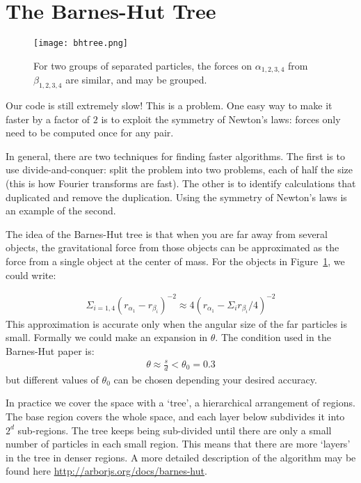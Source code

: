 \documentclass[12pt]{article}
\begin{document}
\section{The Barnes-Hut Tree}

\begin{figure}
\texttt{[image: bhtree.png]}
\centering
\caption{For two groups of separated particles, the forces on $\alpha_{1,2,3,4}$ from $\beta_{1,2,3,4}$ are similar, and may be grouped.}
\label{fig:particles}
\end{figure}

Our code is still extremely slow! This is a problem. One easy way to make it faster by a factor of $2$ is to exploit the symmetry of Newton's laws: forces only need to be computed once for any pair.

In general, there are two techniques for finding faster algorithms. The first is to use divide-and-conquer: split the problem into two problems, each of half the size (this is how Fourier transforms are fast). The other is to identify calculations that duplicated and remove the duplication. Using the symmetry of Newton's laws is an example of the second.

The idea of the Barnes-Hut tree is that when you are far away from several objects, the gravitational force from those objects can be approximated as the force from a single object at the center of mass. For the objects in Figure~\ref{fig:particles}, we could write:

\begin{align}
 \Sigma_{i=1,4} (r_{\alpha_1} - r_{\beta_i})^{-2} \approx 4 (r_{\alpha_1} - \Sigma_i r_{\beta_i} / 4)^{-2}
\end{align}
This approximation is accurate only when the angular size of the far particles is small. Formally we could make an expansion in $\theta$. The condition used in the Barnes-Hut paper is:
\begin{align}
\theta \approx \frac{s}{d} < \theta_0 = 0.3
\end{align}
but different values of $\theta_0$ can be chosen depending your desired accuracy.

In practice we cover the space with a `tree', a hierarchical arrangement of regions. The base region covers the whole space, and each layer below subdivides it into $2^d$ sub-regions. The tree keeps being sub-divided until there are only a small number of particles in each small region. This means that there are more `layers' in the tree in denser regions. A more detailed description of the algorithm may be found here \url{http://arborjs.org/docs/barnes-hut}.
\end{document}
